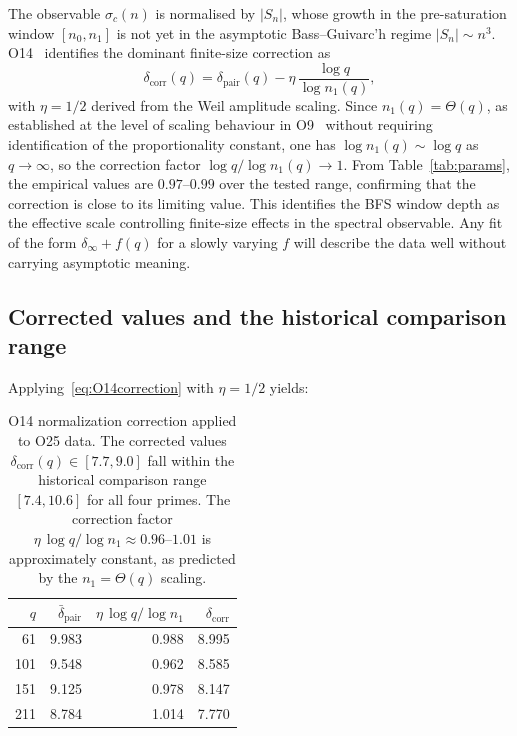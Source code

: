 \documentclass[11pt,a4paper]{article}
\theoremstyle{definition}
\newcommand{\dpair}{\delta_{\mathrm{pair}}}
\newcommand{\dpairmean}{\bar{\delta}_{\mathrm{pair}}}
\begin{document}
      The observable $\sigma_c(n)$ is normalised by $|S_n|$, whose growth in the
      pre-saturation window $[n_0, n_1]$ is not yet in the asymptotic Bass--Guivarc'h
      regime $|S_n| \sim n^3$.
      O14~\cite{Beau2026a18} identifies the dominant finite-size correction as
      \begin{equation}
        \label{eq:O14correction}
        \delta_{\mathrm{corr}}(q) = \dpair(q) - \eta\,\frac{\log q}{\log n_1(q)},
      \end{equation}
      with $\eta = 1/2$ derived from the Weil amplitude scaling.
      Since $n_1(q) = \Theta(q)$, as established at the level of scaling behaviour
      in O9~\cite{Beau2026a13} without requiring identification of the proportionality
      constant, one has $\log n_1(q) \sim \log q$ as $q \to \infty$,
      so the correction factor $\log q / \log n_1(q) \to 1$.
      From Table~\ref{tab:params}, the empirical values are $0.97$--$0.99$ over the
      tested range, confirming that the correction is close to its limiting value.
      This identifies the BFS window depth as the effective scale controlling
      finite-size effects in the spectral observable.
      Any fit of the form $\delta_\infty + f(q)$ for a slowly varying $f$ will
      describe the data well without carrying asymptotic meaning.

    \subsection{Corrected values and the historical comparison range}

      Applying~\eqref{eq:O14correction} with $\eta = 1/2$ yields:

      \begin{table}[h]
        \centering
        \begin{tabular}{rrrr}
          \toprule
          $q$ & $\dpairmean$ & $\eta\,\log q/\log n_1$ & $\delta_{\mathrm{corr}}$ \\
          \midrule
          61  & 9.983        & 0.988                   & 8.995                    \\
          101 & 9.548        & 0.962                   & 8.585                    \\
          151 & 9.125        & 0.978                   & 8.147                    \\
          211 & 8.784        & 1.014                   & 7.770                    \\
          \bottomrule
        \end{tabular}
        \caption{O14 normalization correction applied to O25 data.
        The corrected values $\delta_{\mathrm{corr}}(q) \in [7.7, 9.0]$ fall within
        the historical comparison range $[7.4, 10.6]$ for all four primes.
        The correction factor $\eta\,\log q/\log n_1 \approx 0.96$--$1.01$ is
        approximately constant, as predicted by the $n_1 = \Theta(q)$ scaling.}
        \label{tab:corrected}
      \end{table}
\end{document}
